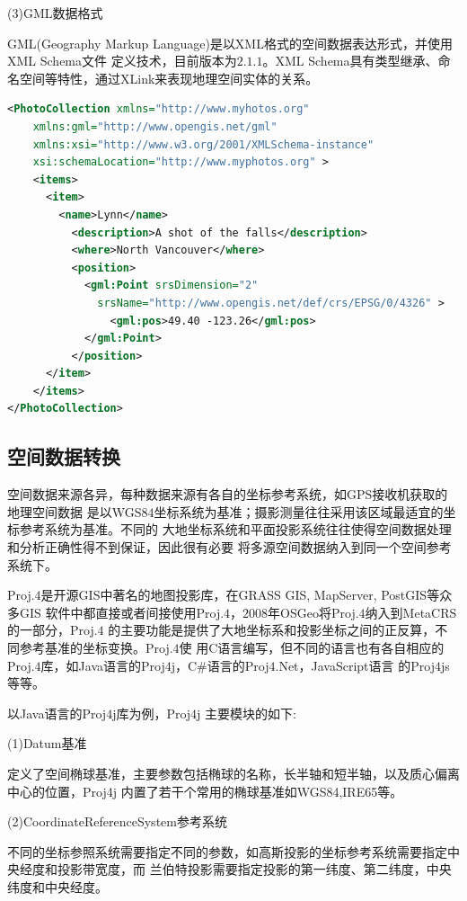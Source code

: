 (3)GML数据格式  

GML(Geography Markup Language)是以XML格式的空间数据表达形式，并使用XML Schema文件
定义技术，目前版本为$2.1.1$。XML Schema具有类型继承、命名空间等特性，通过XLink来表现地理空间实体的关系。
\begin{lstlisting}[language=XML]
<PhotoCollection xmlns="http://www.myhotos.org"
    xmlns:gml="http://www.opengis.net/gml"
    xmlns:xsi="http://www.w3.org/2001/XMLSchema-instance"
    xsi:schemaLocation="http://www.myphotos.org" >
    <items>
      <item>
        <name>Lynn</name>
          <description>A shot of the falls</description>
          <where>North Vancouver</where>
          <position>
            <gml:Point srsDimension="2" 
              srsName="http://www.opengis.net/def/crs/EPSG/0/4326" >
                <gml:pos>49.40 -123.26</gml:pos>
            </gml:Point>
          </position>
      </item>
    </items>
</PhotoCollection>
\end{lstlisting}

\subsection{空间数据转换}
空间数据来源各异，每种数据来源有各自的坐标参考系统，如GPS接收机获取的地理空间数据
是以WGS$84$坐标系统为基准；摄影测量往往采用该区域最适宜的坐标参考系统为基准。不同的
大地坐标系统和平面投影系统往往使得空间数据处理和分析正确性得不到保证，因此很有必要
将多源空间数据纳入到同一个空间参考系统下。

Proj.$4$是开源GIS中著名的地图投影库\cite{Urbanek2012proj4}，在GRASS GIS, MapServer, PostGIS等众多GIS
软件中都直接或者间接使用Proj.$4$，$2008$年OSGeo将Proj.$4$纳入到MetaCRS的一部分，Proj.$4$
的主要功能是提供了大地坐标系和投影坐标之间的正反算，不同参考基准的坐标变换。Proj.$4$使
用C语言编写，但不同的语言也有各自相应的Proj.$4$库，如Java语言的Proj$4$j，C\#语言的Proj$4$.Net，JavaScript语言
的Proj$4$js等等。

以Java语言的Proj$4$j库为例，Proj$4$j 主要模块的如下:

(1)Datum基准

定义了空间椭球基准，主要参数包括椭球的名称，长半轴和短半轴，以及质心偏离中心的位置，Proj4j
内置了若干个常用的椭球基准如WGS84,IRE65等。

(2)CoordinateReferenceSystem参考系统

不同的坐标参照系统需要指定不同的参数，如高斯投影的坐标参考系统需要指定中央经度和投影带宽度，而
兰伯特投影需要指定投影的第一纬度、第二纬度，中央纬度和中央经度。


